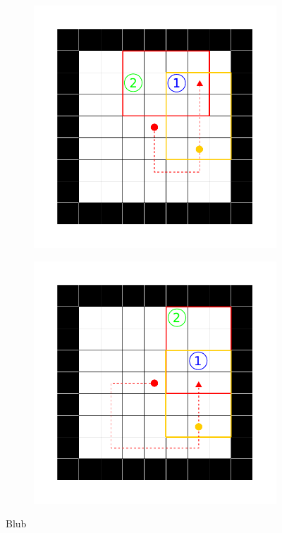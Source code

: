 \begin{figure}[ht!]
\begin{subfigure}[c]{0.5\textwidth}
    \subcaption{}
    \label{sample_visited}
  \end{subfigure}
  \begin{subfigure}[c]{0.5\textwidth}
    \includegraphics[keepaspectratio,width=\textwidth]{abbildungen/sample_seen.pdf}
    \subcaption{}
    \label{sample_seen2}
  \end{subfigure}
  \begin{subfigure}[c]{0.5\textwidth}
    \includegraphics[keepaspectratio,width=\textwidth]{abbildungen/sample_seen2.pdf}
    \subcaption{}
    \label{sample_seen2}
  \end{subfigure}
  \caption{Blub}
\end{figure}
\fi
